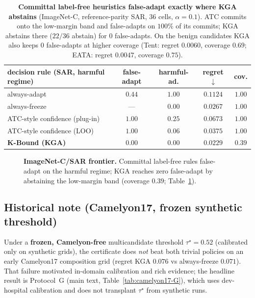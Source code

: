 \begin{table}[tb]\centering\scriptsize
\setlength{\tabcolsep}{3.5pt}
{%
\begin{tabular}{lcccc}
\toprule
decision rule (SAR, harmful regime) & false-adapt & harmful-ad. & regret $\downarrow$ & cov. \\
\midrule
always-adapt                  & $0.44$ & $1.00$ & $0.1124$ & $1.00$ \\
always-freeze                 & ---    & $0.00$ & $0.0267$ & $1.00$ \\
ATC-style confidence (plug-in)& $1.00$ & $0.25$ & $0.0673$ & $1.00$ \\
ATC-style confidence (LOO)    & $1.00$ & $0.06$ & $0.0375$ & $1.00$ \\
\textbf{K-Bound (KGA)}        & $\mathbf{0.00}$ & $\mathbf{0.00}$ & $0.0229$ & $0.39$ \\
\bottomrule
\end{tabular}}
\caption{\textbf{Committal label-free heuristics false-adapt exactly where \textsc{KGA} abstains}
(ImageNet-C, reference-parity SAR, $36$ cells, $\alpha{=}0.1$). ATC commits onto the low-margin band
and false-adapts on $100\%$ of its commits; \textsc{KGA} abstains there ($22/36$ abstain) for $0$
false-adapts. On the benign candidates \textsc{KGA} also keeps $0$ false-adapts at higher coverage
(Tent: regret $0.0060$, coverage $0.69$; EATA: regret $0.0047$, coverage $0.75$).}
\label{tab:app-imagenetc}
\end{table}

\begin{figure}[tb]\centering
{}
\caption{\textbf{ImageNet-C/SAR frontier.} Committal label-free rules false-adapt on the harmful
regime; \textsc{KGA} reaches zero false-adapt by abstaining the low-margin band (coverage $0.39$;
Table~\ref{tab:app-imagenetc}).}
\label{fig:app-imagenetc}
\end{figure}

\subsection{Historical note (Camelyon17, frozen synthetic threshold)}
\label{app:cam-honest}
Under a \textbf{frozen, Camelyon-free} multicandidate threshold $\tau^\star{=}0.52$
(calibrated only on synthetic grids), the certificate does \emph{not} beat both trivial policies
on an early Camelyon17 composition grid (regret \textsc{KGA} $0.076$ vs always-freeze $0.071$).
That failure motivated in-domain calibration and rich evidence; the headline result is
Protocol~G (main text, Table~\ref{tab:camelyon17-G}), which uses dev-hospital calibration and
does not transplant $\tau^\star$ from synthetic runs.
